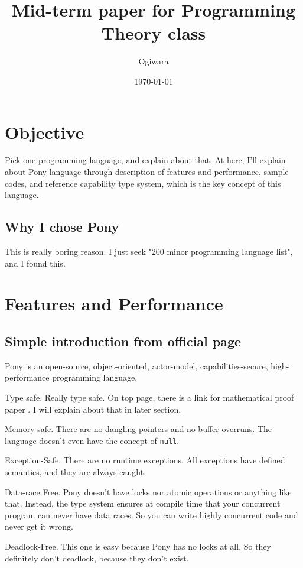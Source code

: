 \documentclass{article}
\title{Mid-term paper for Programming Theory class}
\author{Ogiwara}
\date{\today}
\begin{document}
\begin{multicols}{2}
[
\maketitle
]
\section{Objective}
Pick one programming language, and explain about that.
At here, I'll explain about Pony language \cite{ponylang} through description of features and performance, sample codes, and reference capability type system, which is the key concept of this language.

\subsection{Why I chose Pony}
This is really boring reason. I just seek "200 minor programming language list"\cite{200}, and I found this.  

\section{Features and Performance}

\subsection{Simple introduction from official page \cite{ponylang}}
Pony is an open-source, object-oriented, actor-model, capabilities-secure, high-performance programming language. 

Type safe. Really type safe. On top page, there is a link for mathematical proof paper \cite{type-proof-paper}. I will explain about that in later section.

Memory safe. There are no dangling pointers and no buffer overruns. The language doesn't even have the concept of \texttt{null}. 

Exception-Safe. There are no runtime exceptions. All exceptions have defined semantics, and they are always caught. 

Data-race Free. Pony doesn’t have locks nor atomic operations or anything like that. Instead, the type system ensures at compile time that your concurrent program can never have data races. So you can write highly concurrent code and never get it wrong. 

Deadlock-Free. This one is easy because Pony has no locks at all. So they definitely don’t deadlock, because they don’t exist.


\end{multicols}
\end{document}

